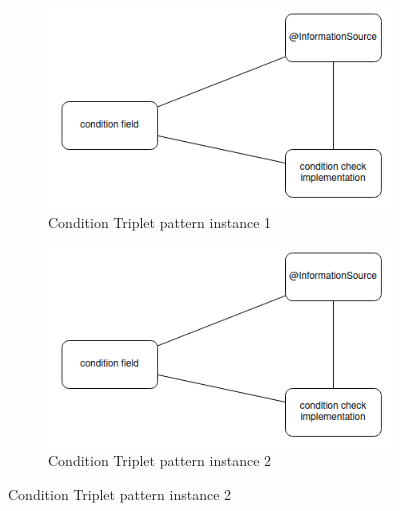 \begin{figure}
    \centering
    \begin{subfigure}[b]{0.45\linewidth}
        \centering
        \includegraphics[width=\linewidth]{./figures/condition-triplet-pattern}
        \caption{Condition Triplet pattern instance 1}
        \label{fig:condition-triplet-pattern-instance-1}
    \end{subfigure}
    \hspace{5mm} %
    \begin{subfigure}[b]{0.45\linewidth}
        \centering
        \includegraphics[width=\linewidth]{./figures/condition-triplet-pattern}
        \caption{Condition Triplet pattern instance 2}
        \label{fig:condition-triplet-pattern-instance-2}
    \end{subfigure}
    \label{fig:coffee}
\end{figure}





